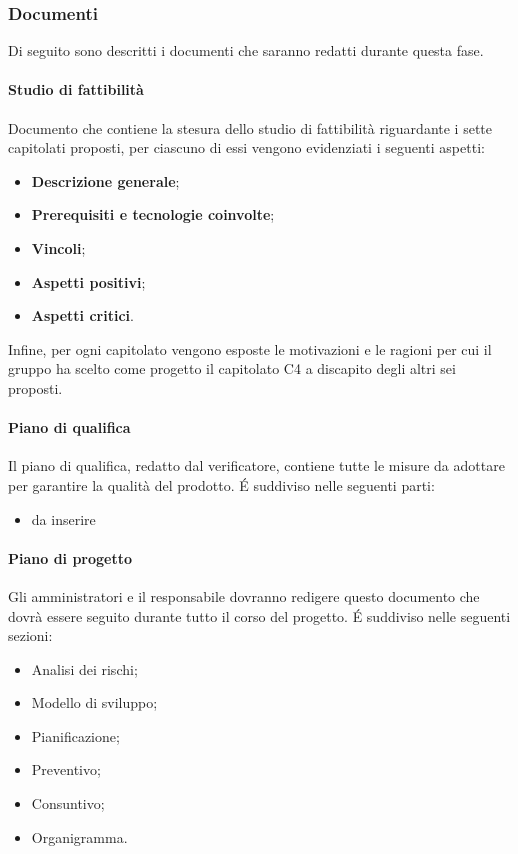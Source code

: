 \subsubsection{Documenti}
Di seguito sono descritti i documenti che saranno redatti durante questa fase.
\paragraph{Studio di fattibilità}
Documento che contiene la stesura dello studio di fattibilità riguardante i sette capitolati proposti, per ciascuno di essi vengono evidenziati i seguenti aspetti:
\begin{itemize}
    \item \textbf{Descrizione generale};
    \item \textbf{Prerequisiti e tecnologie coinvolte};
    \item \textbf{Vincoli};
    \item \textbf{Aspetti positivi};
    \item \textbf{Aspetti critici}.
\end{itemize}
Infine, per ogni capitolato vengono esposte le motivazioni e le ragioni per cui il gruppo ha scelto come progetto il capitolato C4 \NomeProgetto{} a discapito degli altri sei proposti.\\
\paragraph{Piano di qualifica}
Il piano di qualifica, redatto dal verificatore, contiene tutte le misure da adottare per garantire la qualità del prodotto. \'E suddiviso nelle seguenti parti:
\begin{itemize}
\item da inserire
\end{itemize} 
\paragraph{Piano di progetto}
Gli amministratori e il responsabile dovranno redigere questo documento che dovrà essere seguito durante tutto il corso del progetto. \'E suddiviso nelle seguenti sezioni:
\begin{itemize}
    \item Analisi dei rischi;
    \item Modello di sviluppo;
   \item Pianificazione;  
    \item Preventivo;
    \item Consuntivo;
    \item Organigramma.   
\end{itemize}
